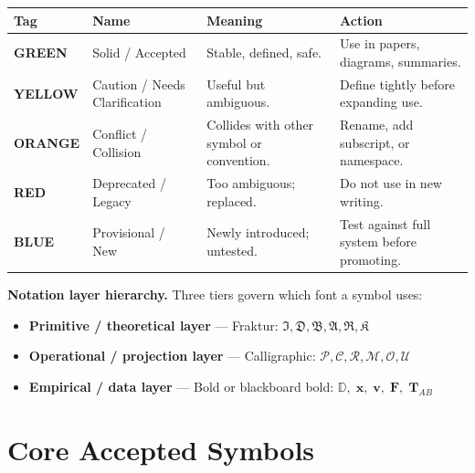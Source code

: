 \documentclass[11pt, a4paper, oneside]{article}
\newcommand{\GRN}{\colorbox{GreenBG}{\textcolor{GreenFG}{\small\bfseries GREEN}}}
\newcommand{\YEL}{\colorbox{YellowBG}{\textcolor{YellowFG}{\small\bfseries YELLOW}}}
\newcommand{\ORG}{\colorbox{OrangeBG}{\textcolor{OrangeFG}{\small\bfseries ORANGE}}}
\newcommand{\RED}{\colorbox{RedBG}{\textcolor{RedFG}{\small\bfseries RED}}}
\newcommand{\BLU}{\colorbox{BlueBG}{\textcolor{BlueFG}{\small\bfseries BLUE}}}
\begin{document}
\begin{center}
\begin{tabular}{C{1.5cm} L{3.5cm} L{4cm} L{5cm}}
  \toprule
  \textbf{Tag} & \textbf{Name} & \textbf{Meaning} & \textbf{Action} \\
  \midrule
  \GRN  & Solid / Accepted &
    Stable, defined, safe. &
    Use in papers, diagrams, summaries. \\[4pt]
  \YEL  & Caution / Needs Clarification &
    Useful but ambiguous. &
    Define tightly before expanding use. \\[4pt]
  \ORG  & Conflict / Collision &
    Collides with other symbol or convention. &
    Rename, add subscript, or namespace. \\[4pt]
  \RED  & Deprecated / Legacy &
    Too ambiguous; replaced. &
    Do not use in new writing. \\[4pt]
  \BLU  & Provisional / New &
    Newly introduced; untested. &
    Test against full system before promoting. \\
  \bottomrule
\end{tabular}
\end{center}

\medskip
\noindent\textbf{Notation layer hierarchy.}
Three tiers govern which font a symbol uses:
\begin{itemize}
  \item \textbf{Primitive / theoretical layer} --- Fraktur:
    $\mathfrak{I}, \mathfrak{D}, \mathfrak{B}, \mathfrak{A},
     \mathfrak{R}, \mathfrak{K}$
  \item \textbf{Operational / projection layer} --- Calligraphic:
    $\mathcal{P}, \mathcal{C}, \mathcal{R}, \mathcal{M},
     \mathcal{O}, \mathcal{U}$
  \item \textbf{Empirical / data layer} --- Bold or blackboard bold:
    $\mathbb{D},\;\mathbf{x},\;\mathbf{v},\;\mathbf{F},\;\mathbf{T}_{AB}$
\end{itemize}

\section{Core Accepted Symbols}
\label{sec:core}
\end{document}
